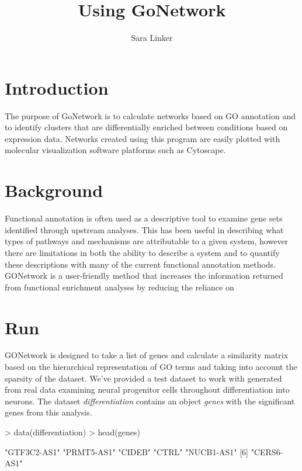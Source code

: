 \documentclass{article}
\title{Using GoNetwork}
\author{Sara Linker}
\begin{document}
\maketitle


\section*{Introduction}
  The purpose of GoNetwork is to calculate networks based on GO annotation and to identify clusters that are differentially enriched between conditions based on expression data. Networks created using this program are easily plotted with molecular visualization software platforms such as Cytoscape. 

 \section*{Background}
   Functional annotation is often used as a descriptive tool to examine gene sets identified through upstream analyses. This has been useful in describing what types of pathways and mechanisms are attributable to a given system, however there are limitations in both the ability to describe a system and to quantify these descriptions with many of the current functional annotation methods. GONetwork is a user-friendly method that increases the information returned from functional enrichment analyses by reducing the reliance on 


\section*{Run}
GONetwork is designed to take a list of genes and calculate a similarity matrix based on the hierarchical representation of GO terms and taking into account the sparsity of the dataset. We've provided a test dataset to work with generated from real data examining neural progenitor cells throughout differentiation into neurons. The dataset \textsl{differentiation} contains an object \textsl{genes} with the significant genes from this analysis.

\begin{Schunk}
\begin{Sinput}
> data(differentiation)
> head(genes)
\end{Sinput}
\begin{Soutput}
[1] "GTF3C2-AS1" "PRMT5-AS1"  "CIDEB"      "CTRL"       "NUCB1-AS1" 
[6] "CERS6-AS1" 
\end{Soutput}
\end{Schunk}
\end{document}
